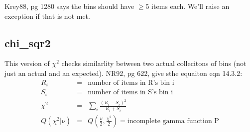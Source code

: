 Krey88, pg 1280 says the bins should have $\ge 5$ items each.  We'll
raise an exception if that is not met.

\subsection*{chi\_sqr2}
This version of $\chi^2$ checks similarlity between two actual
collecitons of bins (not just an actual and an expected).
NR92, pg 622, give sthe equaiton eqn 14.3.2:
\begin{eqnarray}
  R_i & = & \mbox{number of items in R's bin i}\\
  S_i & = & \mbox{number of items in S's bin i}\\
  \chi^2 & = & \sum_i\frac{(R_i-S_i)^2}{R_i+S_i}\\
  Q(\chi^2|\nu) & = & Q(\frac{\nu}{2},\frac{\chi^2}{2})
         = \mbox{incomplete gamma function P}
\end{eqnarray}

